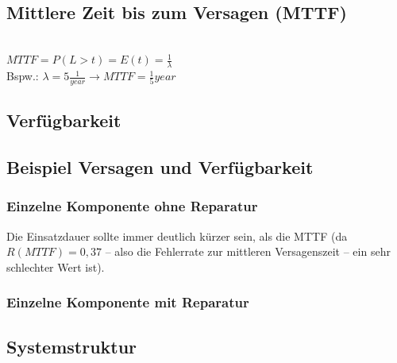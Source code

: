 \subsection{Mittlere Zeit bis zum Versagen (MTTF)}
\\
$MTTF=P(L>t)=E(t)=\frac{1}{\lambda}$\\
Bspw.: $\lambda=5 \frac{1}{year} \to MTTF=\frac{1}{5}year$

\subsection{Verfügbarkeit}

\subsection{Beispiel Versagen und Verfügbarkeit}
\subsubsection{Einzelne Komponente ohne Reparatur}
Die Einsatzdauer sollte immer deutlich kürzer sein, als die MTTF (da $R(MTTF)=0,37$ -- also die Fehlerrate zur mittleren Versagenszeit -- ein sehr schlechter Wert ist).
\subsubsection{Einzelne Komponente mit Reparatur}

\subsection{Systemstruktur}

